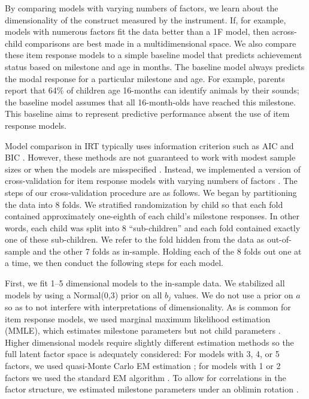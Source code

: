 \documentclass[man, floatsintext]{apa7}
\begin{document}
By comparing models with varying numbers of factors, we learn about the
dimensionality of the construct measured by the instrument. If, for
example, models with numerous factors fit the data better than a 1F
model, then across-child comparisons are best made in a multidimensional
space. We also compare these item response models to a simple baseline
model that predicts achievement status based on milestone and age in
months. The baseline model always predicts the modal response for a particular milestone and age. For example, parents
report that 64\% of children age 16-months can identify animals by their sounds; the baseline model assumes that all 16-month-olds have reached this
milestone. This baseline aims to represent predictive performance 
absent the use of item response models.

Model comparison in IRT typically
uses information criterion such as AIC and BIC \parencite{maydeu-olivares2013}. However, these
methods are not guaranteed to work with modest sample sizes or when the
models are misspeciﬁed \parencite{mcdonald1995}. Instead, we implemented a version of
cross-validation for item response models with varying numbers of
factors \parencite{bergner2012}. The steps of our cross-validation procedure are as
follows. We began by partitioning the data into 8 folds. We stratified
randomization by child so that each fold contained approximately
one-eighth of each child's milestone responses. In other words, each
child was split into 8 ``sub-children'' and each fold contained exactly
one of these sub-children. We refer to the fold hidden from the data as
out-of-sample and the other 7 folds as in-sample. Holding each of the 8
folds out one at a time, we then conduct the following steps for each
model.

First, we fit 1--5 dimensional models to the in-sample data. 
We stabilized all models by using a Normal(0,3) prior on all $b_j$ values. 
We do not use a prior on $a$ so as to not
interfere with interpretations of dimensionality. 
As is common for item
response models, we used marginal maximum likelihood estimation (MMLE),
which estimates milestone parameters but not child parameters \parencite{baker2004}.
Higher dimensional models require slightly different estimation methods
so the full latent factor space is adequately considered: For models
with 3, 4, or 5 factors, we used quasi-Monte Carlo EM estimation \parencite{jank2005};
for models with 1 or 2 factors we used the standard EM algorithm \parencite{bock1981}.
To allow for correlations in the factor structure, we estimated
milestone parameters under an oblimin rotation \parencite{jennrich1966}.
\end{document}

